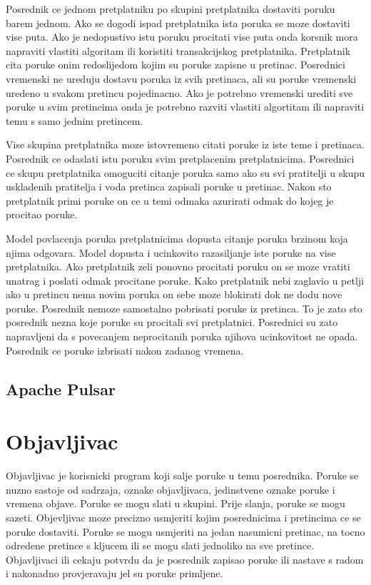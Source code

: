 \documentclass[times, utf8, diplomski, numeric]{fer}
\begin{document}
Posrednik ce jednom pretplatniku po skupini pretplatnika dostaviti poruku barem jednom. Ako se dogodi ispad pretplatnika ista poruka se moze dostaviti vise puta. Ako je nedopustivo istu poruku procitati vise puta onda korsnik mora napraviti vlastiti algoritam ili koristiti transakcijskog pretplatnika. Pretplatnik cita poruke onim redoslijedom kojim su poruke zapisne u pretinac. Posrednici vremenski ne ureduju dostavu poruka iz svih pretinaca, ali su poruke vremenski uredeno u svakom pretincu pojedinacno. Ako je potrebno vremenski urediti sve poruke u svim pretincima onda je potrebno razviti vlastiti algortitam ili napraviti temu s samo jednim pretincem.

Vise skupina pretplatnika moze istovremeno citati poruke iz iste teme i pretinaca. Posrednik ce odaslati istu poruku svim pretplacenim pretplatnicima. Posrednici ce skupu pretplatnika omoguciti citanje poruka samo ako su svi pratitelji u skupu uskladenih pratitelja i voda pretinca zapisali poruke u pretinac. Nakon sto pretplatnik primi poruke on ce u temi odmaka azurirati odmak do kojeg je procitao poruke.

Model povlacenja poruka pretplatnicima dopusta citanje poruka brzinom koja njima odgovara. Model dopusta i ucinkovito razasiljanje iste poruke na vise pretplatnika. Ako pretplatnik zeli ponovno procitati poruku on se moze vratiti unatrag i poslati odmak procitane poruke. Kako pretplatnik nebi zaglavio u petlji ako u pretincu nema novim poruka on sebe moze blokirati dok ne dodu nove poruke. Posrednik nemoze samostalno pobrisati poruke iz pretinca. To je zato sto posrednik nezna koje poruke su procitali svi pretplatnici. Posrednici su zato napravljeni da s povecanjem neprocitanih poruka njihova ucinkovitost ne opada. Posrednik ce poruke izbrisati nakon zadanog vremena.



\section{Apache Pulsar}



\chapter{Objavljivac}
Objavljivac je korisnicki program koji salje poruke u temu posrednika. Poruke se nuzno sastoje od sadrzaja, oznake objavljivaca, jedinstvene oznake poruke i vremena objave. Poruke se mogu slati u skupini. Prije slanja, poruke se mogu sazeti. Objevljivac moze precizno usmjeriti kojim posrednicima i pretincima ce se poruke dostaviti. Poruke se mogu usmjeriti na jedan nasumicni pretinac, na tocno odredene pretince s kljucem ili se mogu slati jednoliko na sve pretince. Objavljivaci ili cekaju potvrdu da je posrednik zapisao poruke ili nastave s radom i nakonadno provjeravaju jel su poruke primljene.
\end{document}
